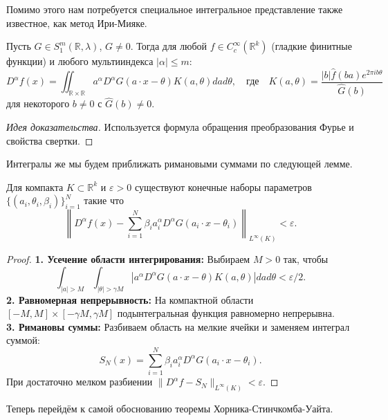 \documentclass[../NDCNNAI_main.tex]{subfiles}
\begin{document}
Помимо этого нам потребуется специальное интегральное представление также известное, как метод Ири-Мияке.

\begin{lemma}
Пусть $G \in S^m_1(\mathbb{R}, \lambda)$, $G \neq 0$. Тогда для любой $f \in C^\infty_c(\mathbb{R}^k)$ (гладкие финитные функции) и любого мультииндекса $|\alpha| \leq m$:
\[
D^\alpha f(x) = \iint_{\mathbb{R} \times \mathbb{R}} a^\alpha D^\alpha G(a \cdot x - \theta) K(a, \theta) da d\theta,
\quad \text{где} \quad
K(a, \theta) = \frac{|b| \widehat{f}(ba) e^{2\pi i b\theta}}{\widehat{G}(b)}
\]
для некоторого $b \neq 0$ с $\widehat{G}(b) \neq 0$.
\end{lemma}

\begin{proof}[Идея доказательства]
Используется формула обращения преобразования Фурье и свойства свертки.
\end{proof}

Интегралы же мы будем приближать римановыми суммами по следующей лемме.
\begin{lemma}
Для компакта $K \subset \mathbb{R}^k$ и $\varepsilon > 0$ существуют конечные наборы параметров $\{(a_i, \theta_i, \beta_i)\}_{i=1}^N$ такие что
\[
\left\| D^\alpha f(x) - \sum_{i=1}^N \beta_i a_i^\alpha D^\alpha G(a_i \cdot x - \theta_i) \right\|_{L^\infty(K)} < \varepsilon.
\]
\end{lemma}

\begin{proof}
\textbf{1. Усечение области интегрирования:} Выбираем $M > 0$ так, чтобы
\[
\int_{|a|>M} \int_{|\theta|>\gamma M} |a^\alpha D^\alpha G(a \cdot x - \theta) K(a, \theta)| da d\theta < \varepsilon/2.
\]
\textbf{2. Равномерная непрерывность:} На компактной области $[-M, M] \times [-\gamma M, \gamma M]$ подынтегральная функция равномерно непрерывна.\\
\textbf{3. Римановы суммы:} Разбиваем область на мелкие ячейки и заменяем интеграл суммой:
\[
S_N(x) = \sum_{i=1}^N \beta_i a_i^\alpha D^\alpha G(a_i \cdot x - \theta_i).
\]
При достаточно мелком разбиении $\|D^\alpha f - S_N\|_{L^\infty(K)} < \varepsilon$.
\end{proof}

Теперь перейдём к самой обоснованию теоремы Хорника-Стинчкомба-Уайта.
\end{document}

